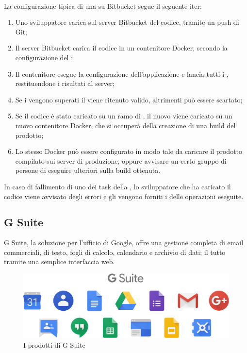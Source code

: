    \paragraph*{} La configurazione tipica di una  su Bitbucket segue il seguente iter:
   \begin{enumerate}
      \item{Uno sviluppatore carica sul server Bitbucket del codice, tramite un push di Git;}
      \item{Il server Bitbucket carica il codice in un contenitore Docker, secondo la configurazione del ;}
      \item{Il contenitore esegue la configurazione dell'applicazione e lancia tutti i , restituendone i risultati al server;}
      \item{Se i  vengono superati il  viene ritenuto valido, altrimenti può essere scartato;}
      \item{Se il codice è stato caricato su un ramo di , il nuovo  viene caricato su un nuovo contenitore Docker, che si occuperà della creazione di una build del prodotto;}
      \item{Lo stesso Docker può essere configurato in modo tale da caricare il prodotto compilato sui server di produzione, oppure avvisare un certo gruppo di persone di eseguire ulteriori  sulla build ottenuta.}
   \end{enumerate}
   In caso di fallimento di uno dei task della , lo sviluppatore che ha caricato il codice viene avvisato degli errori e gli vengono forniti i  delle operazioni eseguite.

   \subsection{G Suite}
   G Suite, la soluzione per l'ufficio di Google, offre una gestione completa di email commerciali,  di testo, fogli di calcolo, calendario e archivio di dati; il tutto tramite una semplice interfaccia web.
   \begin{figure}[H]
      \begin{center}
      \includegraphics[width=16cm,keepaspectratio]{immagini/g-suite-products}
      \end{center}
      \caption{I prodotti di G Suite}
   \end{figure}

